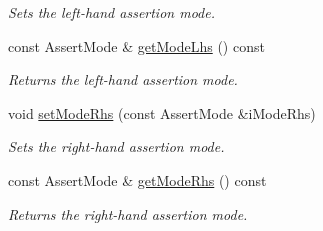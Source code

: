 \begin{DoxyCompactItemize}
\begin{DoxyCompactList}\small\item\em Sets the left-\/hand assertion mode. \end{DoxyCompactList}\item 
\hypertarget{class_assertion_a01c7441478143582d97797f555cc50fc}{const Assert\-Mode \& \hyperlink{class_assertion_a01c7441478143582d97797f555cc50fc}{get\-Mode\-Lhs} () const }\label{class_assertion_a01c7441478143582d97797f555cc50fc}

\begin{DoxyCompactList}\small\item\em Returns the left-\/hand assertion mode. \end{DoxyCompactList}\item 
\hypertarget{class_assertion_a59d5b15c6b30a9d1d461a8e81c19daf4}{void \hyperlink{class_assertion_a59d5b15c6b30a9d1d461a8e81c19daf4}{set\-Mode\-Rhs} (const Assert\-Mode \&i\-Mode\-Rhs)}\label{class_assertion_a59d5b15c6b30a9d1d461a8e81c19daf4}

\begin{DoxyCompactList}\small\item\em Sets the right-\/hand assertion mode. \end{DoxyCompactList}\item 
\hypertarget{class_assertion_aec6c1c7acfdd75cfd1ee0af0484c5f20}{const Assert\-Mode \& \hyperlink{class_assertion_aec6c1c7acfdd75cfd1ee0af0484c5f20}{get\-Mode\-Rhs} () const }\label{class_assertion_aec6c1c7acfdd75cfd1ee0af0484c5f20}

\begin{DoxyCompactList}\small\item\em Returns the right-\/hand assertion mode. \end{DoxyCompactList}\end{DoxyCompactItemize}
